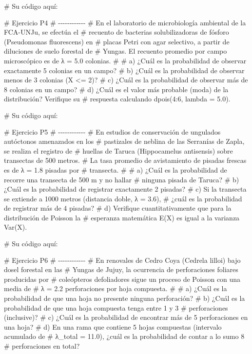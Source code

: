 \documentclass[
  spanish,
  letterpaper,
  DIV=11,
  numbers=noendperiod]{scrreprt}
\newenvironment{Shaded}{\begin{snugshade}}{\end{snugshade}}
\newcommand{\CommentTok}[1]{\textcolor[rgb]{0.37,0.37,0.37}{#1}}
\begin{document}
\begin{Shaded}
\begin{Highlighting}[]
\CommentTok{\# Su código aquí:}


\CommentTok{\# Ejercicio P4}
\CommentTok{\# {-}{-}{-}{-}{-}{-}{-}{-}{-}{-}{-}{-}}
\CommentTok{\# En el laboratorio de microbiología ambiental de la FCA{-}UNJu, se efectúa el}
\CommentTok{\# recuento de bacterias solubilizadoras de fósforo (Pseudomonas fluorescens) en}
\CommentTok{\# placas Petri con agar selectivo, a partir de diluciones de suelo forestal de}
\CommentTok{\# Yungas. El recuento promedio por campo microscópico es de λ = 5.0 colonias.}
\CommentTok{\#}
\CommentTok{\# a) ¿Cuál es la probabilidad de observar exactamente 5 colonias en un campo?}
\CommentTok{\# b) ¿Cuál es la probabilidad de observar menos de 3 colonias (X \textless{}= 2)?}
\CommentTok{\# c) ¿Cuál es la probabilidad de observar más de 8 colonias en un campo?}
\CommentTok{\# d) ¿Cuál es el valor más probable (moda) de la distribución? Verifique su}
\CommentTok{\#    respuesta calculando dpois(4:6, lambda = 5.0).}

\CommentTok{\# Su código aquí:}


\CommentTok{\# Ejercicio P5}
\CommentTok{\# {-}{-}{-}{-}{-}{-}{-}{-}{-}{-}{-}{-}}
\CommentTok{\# En estudios de conservación de ungulados autóctonos amenazados en los}
\CommentTok{\# pastizales de neblina de las Serranías de Zapla, se realiza el registro de}
\CommentTok{\# huellas de Taruca (Hippocamelus antisensis) sobre transectas de 500 metros.}
\CommentTok{\# La tasa promedio de avistamiento de pisadas frescas es de λ = 1.8 pisadas por}
\CommentTok{\# transecta.}
\CommentTok{\#}
\CommentTok{\# a) ¿Cuál es la probabilidad de recorre una transecta de 500 m y no hallar}
\CommentTok{\#    ninguna pisada de Taruca?}
\CommentTok{\# b) ¿Cuál es la probabilidad de registrar exactamente 2 pisadas?}
\CommentTok{\# c) Si la transecta se extiende a 1000 metros (distancia doble, λ = 3.6),}
\CommentTok{\#    ¿cuál es la probabilidad de registrar más de 4 pisadas?}
\CommentTok{\# d) Verifique cuantitativamente que para la distribución de Poisson la}
\CommentTok{\#    esperanza matemática E(X) es igual a la varianza Var(X).}

\CommentTok{\# Su código aquí:}


\CommentTok{\# Ejercicio P6}
\CommentTok{\# {-}{-}{-}{-}{-}{-}{-}{-}{-}{-}{-}{-}}
\CommentTok{\# En renovales de Cedro Coya (Cedrela lilloi) bajo dosel forestal en las}
\CommentTok{\# Yungas de Jujuy, la ocurrencia de perforaciones foliares producidas por}
\CommentTok{\# coleópteros defoliadores sigue un proceso de Poisson con una media de}
\CommentTok{\# λ = 2.2 perforaciones por hoja compuesta.}
\CommentTok{\#}
\CommentTok{\# a) ¿Cuál es la probabilidad de que una hoja no presente ninguna perforación?}
\CommentTok{\# b) ¿Cuál es la probabilidad de que una hoja compuesta tenga entre 1 y 3}
\CommentTok{\#    perforaciones (inclusive)?}
\CommentTok{\# c) ¿Cuál es la probabilidad de encontrar más de 5 perforaciones en una hoja?}
\CommentTok{\# d) En una rama que contiene 5 hojas compuestas (intervalo acumulado de}
\CommentTok{\#    λ\_total = 11.0), ¿cuál es la probabilidad de contar a lo sumo 8}
\CommentTok{\#    perforaciones en total?}


\end{Highlighting}
\end{Shaded}
\end{document}
